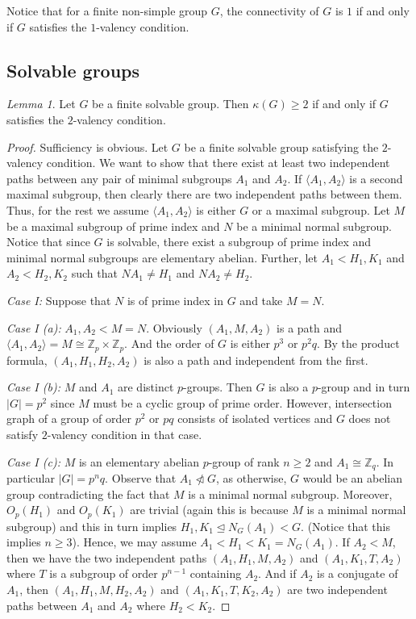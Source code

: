 \documentclass[a4paper,12pt]{article}
\theoremstyle{definition}
\theoremstyle{remark}
\theoremstyle{theorem}
\newtheorem{lem}[theorem]{Lemma}
\begin{document}
Notice that for a finite non-simple group $G$, the connectivity of $G$ is $1$ if and only if $G$ satisfies the $1$-valency condition.


\subsection*{Solvable groups}


\begin{lem}\label{lem:valency2}
  Let $G$ be a finite solvable group. Then $\kappa(G)\geq 2$ if and only
  if $G$ satisfies the $2$-valency condition.
\end{lem}

\begin{proof}
  Sufficiency is obvious. Let $G$ be a finite solvable group
  satisfying the $2$-valency condition. We want to show that there
  exist at least two independent paths between any pair of minimal
  subgroups $A_1$ and $A_2$. If $\langle A_1,A_2\rangle$ is a second
  maximal subgroup, then clearly there are two independent paths
  between them. Thus, for the rest we assume $\langle A_1,A_2\rangle$
  is either $G$ or a maximal subgroup. Let $M$ be a maximal subgroup
  of prime index and $N$ be a minimal normal subgroup. Notice that
  since $G$ is solvable, there exist a subgroup of prime index and
  minimal normal subgroups are elementary abelian. Further, let $A_1<H_1,K_1$
  and $A_2<H_2,K_2$ such that $NA_1\neq H_1$ and $NA_2\neq H_2$.

  \emph{Case I:} Suppose that $N$ is of prime index in $G$ and take
  $M=N$.

  \emph{Case I (a):} $A_1,A_2<M=N$. Obviously $(A_1,M,A_2)$ is a path
  and $\langle A_1,A_2\rangle=M\cong\mathbb{Z}_p\times\mathbb{Z}_p$.
  And the order of $G$ is either $p^3$ or $p^2q$. By the product
  formula, $(A_1,H_1,H_2,A_2)$ is also a path and independent from the
  first.

  \emph{Case I (b):} $M$ and $A_1$ are distinct $p$-groups. Then $G$
  is also a $p$-group and in turn $|G|=p^2$ since $M$ must be a cyclic
  group of prime order. However, intersection graph of a group of
  order $p^2$ or $pq$ consists of isolated vertices and $G$ does not
  satisfy $2$-valency condition in that case.

  \emph{Case I (c):} $M$ is an elementary abelian $p$-group of rank
  $n\geq 2$ and $A_1\cong \mathbb{Z}_q$. In particular
  $|G|=p^nq$. Observe that $A_1\ntriangleleft G$, as otherwise, $G$
  would be an abelian group contradicting the fact that $M$ is a
  minimal normal subgroup. Moreover, $O_p(H_1)$ and
  $O_p(K_1)$ are trivial (again this is because $M$ is a
  minimal normal subgroup) and this in turn implies
  $H_1,K_1\trianglelefteq N_G(A_1)<G$. (Notice that this
  implies $n\geq 3$). Hence, we may assume
  $A_1<H_1<K_1=N_G(A_1)$. If $A_2<M$, then we have the two
  independent paths $(A_1,H_1,M,A_2)$ and $(A_1,K_1,T,A_2)$ where $T$
  is a subgroup of order $p^{n-1}$ containing $A_2$. And if $A_2$ is a
  conjugate of $A_1$, then $(A_1,H_1,M,H_2,A_2)$ and
  $(A_1,K_1,T,K_2,A_2)$ are two independent paths between $A_1$ and
  $A_2$ where $H_2<K_2$.


\end{proof}
\end{document}
